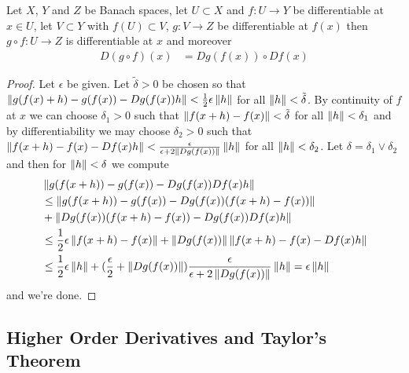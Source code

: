 \begin{prop}\label{ChainRuleBanachSpaces}Let $X$, $Y$ and $Z$ be
  Banach spaces, let $U \subset X$ and $f : U \to Y$ be differentiable
  at $x \in U$, let $V \subset Y$ with $f(U) \subset V$, $g : V \to Z$ be
  differentiable at $f(x)$ then $g \circ f : U \to Z$ is
  differentiable at $x$ and moreover
\begin{align*}
D(g \circ f)(x) &= Dg(f(x)) \circ Df(x)
\end{align*}
\end{prop}
\begin{proof}
Let $\epsilon$ be given.  Let $\tilde{\delta} > 0$ be chosen so that
$\left \lVert g(f(x) + h) - g(f(x)) - Dg(f(x)) h \right \rVert < \frac{1}{2} \epsilon
\left \lVert h \right \rVert$ for all $\left \lVert h \right \rVert < \tilde{\delta}$.  By continuity of $f$
at $x$ we can choose $\delta_1>0$ such that $\left \lVert f(x+h) - f(x) \right \rVert <
\tilde{\delta}$ for all $\left \lVert h \right \rVert < \delta_1$ and by differentiability
we may choose $\delta_2>0$ such that $\left \lVert f(x+h) - f(x) - Df(x)h \right \rVert <
\frac{\epsilon}{\epsilon + 2\left \lVert Dg(f(x)) \right \rVert} \left \lVert h \right \rVert$ for all
$\left \lVert h \right \rVert < \delta_2$.  Let $\delta = \delta_1 \vee \delta_2$ and then
for $\left \lVert h \right \rVert < \delta$ we compute
\begin{align*}
&\left \lVert g(f(x+h)) - g(f(x)) - Dg(f(x)) Df(x) h \right \rVert \\
&\leq \left \lVert g(f(x+h)) -
                                                g(f(x)) - Dg(f(x))
                                                (f(x+h)-f(x))  \right \rVert  \\
&+\left \lVert Dg(f(x))(f(x+h)-f(x))
                                                - Dg(f(x)) Df(x) h \right \rVert\\
&\leq \frac{1}{2} \epsilon\left \lVert f(x+h)-f(x) \right \rVert  +\left \lVert Dg(f(x)) \right \rVert\left \lVert f(x+h)-f(x) - Df(x) h \right \rVert\\
&\leq \frac{1}{2} \epsilon \left \lVert h \right \rVert  +(\frac{\epsilon}{2} +
  \left \lVert Dg(f(x)) \right \rVert) \frac{\epsilon}{\epsilon + 2\left \lVert Dg(f(x)) \right \rVert}
  \left \lVert h \right \rVert = \epsilon \left \lVert h \right \rVert\\
\end{align*}
and we're done.
\end{proof}

\subsection{Higher Order Derivatives and Taylor's Theorem}

